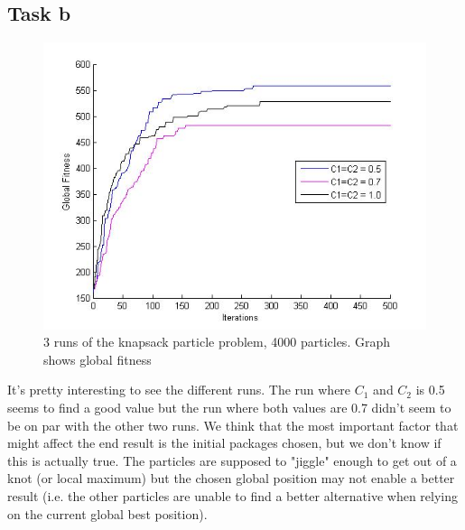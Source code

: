 \documentclass[12pt, a4paper]{article}
\begin{document}
\subsection{Task b}
\begin{figure}[H]
\begin{center}
\includegraphics[width=\linewidth]{KnapSack_noInertia}
\caption{3 runs of the knapsack particle problem, 4000 particles. Graph shows global fitness}
\end{center}

\end{figure}
It's pretty interesting to see the different runs. The run where $C_1$ and $C_2$ is 0.5 seems to find a good value but the run where both values are 0.7 didn't seem to be on par with the other two runs. We think that the most important factor that might affect the end result is the initial packages chosen, but we don't know if this is actually true. The particles are supposed to "jiggle" enough to get out of a knot (or local maximum) but the chosen global position may not enable a better result (i.e. the other particles are unable to find a better alternative when relying on the current global best position).
\end{document}
